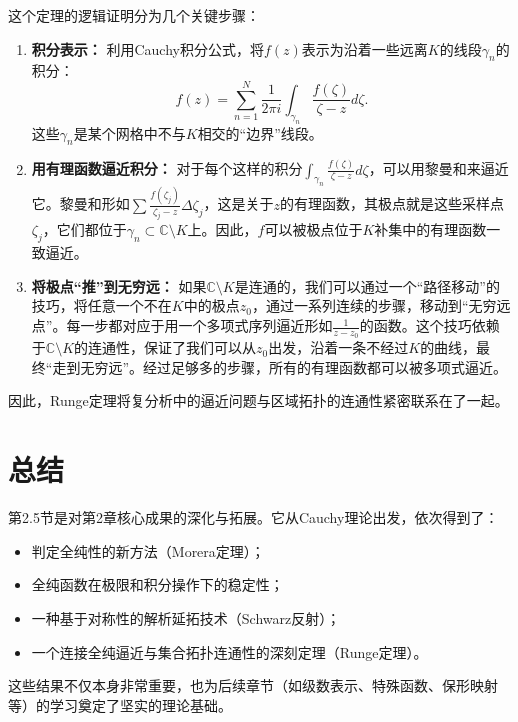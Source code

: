 \documentclass[UTF8]{ctexart}
\numberwithin{equation}{section}
\newcommand{\CC}{\mathbb{C}}
\begin{document}
这个定理的逻辑证明分为几个关键步骤：

\begin{enumerate}
    \item \textbf{积分表示：} 利用Cauchy积分公式，将$f(z)$表示为沿着一些远离$K$的线段$\gamma_n$的积分：
    \[
    f(z) = \sum_{n=1}^N \frac{1}{2\pi i} \int_{\gamma_n} \frac{f(\zeta)}{\zeta - z} d\zeta.
    \]
    这些$\gamma_n$是某个网格中不与$K$相交的“边界”线段。

    \item \textbf{用有理函数逼近积分：} 对于每个这样的积分$\int_{\gamma_n} \frac{f(\zeta)}{\zeta - z} d\zeta$，可以用黎曼和来逼近它。黎曼和形如$\sum \frac{f(\zeta_j)}{\zeta_j - z} \Delta\zeta_j$，这是关于$z$的有理函数，其极点就是这些采样点$\zeta_j$，它们都位于$\gamma_n\subset \CC\setminus K$上。因此，$f$可以被极点位于$K$补集中的有理函数一致逼近。

    \item \textbf{将极点“推”到无穷远：} 如果$\CC\setminus K$是连通的，我们可以通过一个“路径移动”的技巧，将任意一个不在$K$中的极点$z_0$，通过一系列连续的步骤，移动到“无穷远点”。每一步都对应于用一个多项式序列逼近形如$\frac{1}{z-z_0}$的函数。这个技巧依赖于$\CC\setminus K$的连通性，保证了我们可以从$z_0$出发，沿着一条不经过$K$的曲线，最终“走到无穷远”。经过足够多的步骤，所有的有理函数都可以被多项式逼近。
\end{enumerate}

因此，Runge定理将复分析中的逼近问题与区域拓扑的连通性紧密联系在了一起。

\section*{总结}

第2.5节是对第2章核心成果的深化与拓展。它从Cauchy理论出发，依次得到了：
\begin{itemize}
    \item 判定全纯性的新方法（Morera定理）；
    \item 全纯函数在极限和积分操作下的稳定性；
    \item 一种基于对称性的解析延拓技术（Schwarz反射）；
    \item 一个连接全纯逼近与集合拓扑连通性的深刻定理（Runge定理）。
\end{itemize}
这些结果不仅本身非常重要，也为后续章节（如级数表示、特殊函数、保形映射等）的学习奠定了坚实的理论基础。
\end{document}

